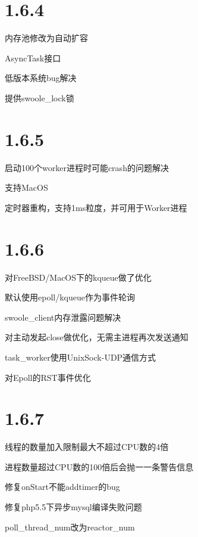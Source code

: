 \section{1.6.4}


\begin{compactitem}
\item 内存池修改为自动扩容
\item AsyncTask接口
\item 低版本系统bug解决
\item 提供swoole\_lock锁
\end{compactitem}

\section{1.6.5}


\begin{compactitem}
\item 启动100个worker进程时可能crash的问题解决
\item 支持MacOS
\item 定时器重构，支持1ms粒度，并可用于Worker进程
\end{compactitem}


\section{1.6.6}



\begin{compactitem}
\item 对FreeBSD/MacOS下的kqueue做了优化
\item 默认使用epoll/kqueue作为事件轮询
\item swoole\_client内存泄露问题解决
\item 对主动发起close做优化，无需主进程再次发送通知
\item task\_worker使用UnixSock-UDP通信方式
\item 对Epoll的RST事件优化
\end{compactitem}

\section{1.6.7}

\begin{compactitem}
\item 线程的数量加入限制最大不超过CPU数的4倍
\item 进程数量超过CPU数的100倍后会抛一一条警告信息
\item 修复onStart不能addtimer的bug
\item 修复php5.5下异步mysql编译失败问题
\item poll\_thread\_num改为reactor_num
\end{compactitem}

